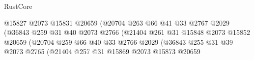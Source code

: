 \begin{lexlean}{RustCore}
\begin{coremodule}
                                                @15827
                                                @2073
                                                @15831
                                                @20659
                                                (@20704
                                                  @263
                                                  @66
                                                  @41
                                                  @33
                                                  @2767
                                                  @2029
                                                  (@36843
                                                    @259
                                                    @31
                                                    @40
                                                    @2073
                                                    @2766
                                                    (@21404
                                                      @261
                                                      @31
                                                      @15848
                                                      @2073
                                                      @15852
                                                      @20659
                                                      (@20704
                                                        @259
                                                        @66
                                                        @40
                                                        @33
                                                        @2766
                                                        @2029
                                                        (@36843
                                                          @255
                                                          @31
                                                          @39
                                                          @2073
                                                          @2765
                                                          (@21404
                                                            @257
                                                            @31
                                                            @15869
                                                            @2073
                                                            @15873
                                                            @20659

\end{coremodule}
\end{lexlean}
